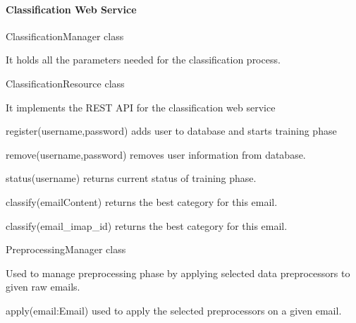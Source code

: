 \paragraph{Classification Web Service}

\begin{my_itemize}
  \item ClassificationManager class
  \begin{my_desc}
    \item[Purpose] It holds all the parameters needed for the classification process.
  \end{my_desc}

  \item ClassificationResource class
  \begin{my_desc}
    \item[Purpose] It implements the REST API for the classification web service
    \item[Functions] \hfill
    \begin{my_itemize}
      \item register(username,password) adds user to database and starts training phase
      \item remove(username,password) removes user information from database.
      \item status(username) returns current status of training phase.
      \item classify(emailContent) returns the best category for this email.
      \item classify(email\_imap\_id) returns the best category for this email.
    \end{my_itemize}
  \end{my_desc}

  \item PreprocessingManager class
  \begin{my_desc}
    \item[Purpose] Used to manage preprocessing phase by applying selected data preprocessors
      to given raw emails.
    \item[Functions] \hfill
    \begin{my_itemize}
      \item apply(email:Email) used to apply the selected preprocessors on a given email.
    \end{my_itemize}
  \end{my_desc}


\end{my_itemize}
